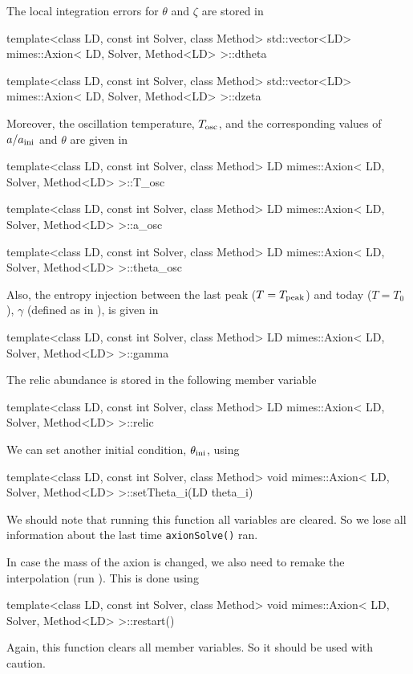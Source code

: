 \documentclass[11pt,a4paper]{article}
\begin{document}
The local integration errors for $\theta$ and $\zeta$ are stored in
%
\begin{cpp}
	template<class LD, const int Solver, class Method> 
	std::vector<LD> mimes::Axion< LD, Solver, Method<LD> >::dtheta
	
	template<class LD, const int Solver, class Method> 
	std::vector<LD> mimes::Axion< LD, Solver, Method<LD> >::dzeta
\end{cpp}
%
Moreover, the oscillation temperature, $T_{\rm osc}{}$, and the corresponding values of $a/a_{\rm ini}{}$ and $\theta$ are given in
%
\begin{cpp}
	template<class LD, const int Solver, class Method>
	LD mimes::Axion< LD, Solver, Method<LD> >::T_osc
	
	template<class LD, const int Solver, class Method>
	LD mimes::Axion< LD, Solver, Method<LD> >::a_osc

	template<class LD, const int Solver, class Method>
	LD mimes::Axion< LD, Solver, Method<LD> >::theta_osc
\end{cpp}
%
Also, the entropy injection between the last peak ($T=T_{\rm peak}$) and today ($T=T_0$), $\gamma$ (defined as in ), is given in 
%
\begin{cpp}
	template<class LD, const int Solver, class Method>
	LD mimes::Axion< LD, Solver, Method<LD> >::gamma
\end{cpp}
%
The relic abundance is stored in the following member variable 
%
\begin{cpp}
	template<class LD, const int Solver, class Method>
	LD mimes::Axion< LD, Solver, Method<LD> >::relic
\end{cpp}



We can set another initial condition, $\theta_{\rm ini}{}$, using 
%
\begin{cpp}
	template<class LD, const int Solver, class Method>
	void mimes::Axion< LD, Solver, Method<LD> >::setTheta_i(LD theta_i)
\end{cpp}
%
We should note that running this function all variables are cleared. So we lose all information about the last time {\tt axionSolve()} ran. 

In case the mass of the axion is changed, we also need to remake  the interpolation (\ie run ). This is done using
%
\begin{cpp}
	template<class LD, const int Solver, class Method>
	void mimes::Axion< LD, Solver, Method<LD> >::restart()
\end{cpp}
%
Again, this function clears all member variables. So it should be used with caution.
\end{document}
